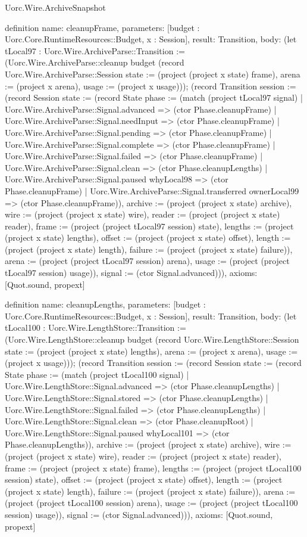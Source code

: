 \begin{lexlean}{Uorc.Wire.ArchiveSnapshot}
\begin{semanticmodule}
definition{
  name: cleanupFrame,
  parameters: [budget : Uorc.Core.RuntimeResources::Budget, x : Session],
  result: Transition,
  body: (let tLocal97 : Uorc.Wire.ArchiveParse::Transition := (Uorc.Wire.ArchiveParse::cleanup budget (record Uorc.Wire.ArchiveParse::Session {state := (project (project x state) frame), arena := (project x arena), usage := (project x usage)})); (record Transition {session := (record Session {state := (record State {phase := (match (project tLocal97 signal)
    | Uorc.Wire.ArchiveParse::Signal.advanced => (ctor Phase.cleanupFrame)
    | Uorc.Wire.ArchiveParse::Signal.needInput => (ctor Phase.cleanupFrame)
    | Uorc.Wire.ArchiveParse::Signal.pending => (ctor Phase.cleanupFrame)
    | Uorc.Wire.ArchiveParse::Signal.complete => (ctor Phase.cleanupFrame)
    | Uorc.Wire.ArchiveParse::Signal.failed => (ctor Phase.cleanupFrame)
    | Uorc.Wire.ArchiveParse::Signal.clean => (ctor Phase.cleanupLengths)
    | Uorc.Wire.ArchiveParse::Signal.paused whyLocal98 => (ctor Phase.cleanupFrame)
    | Uorc.Wire.ArchiveParse::Signal.transferred ownerLocal99 => (ctor Phase.cleanupFrame)), archive := (project (project x state) archive), wire := (project (project x state) wire), reader := (project (project x state) reader), frame := (project (project tLocal97 session) state), lengths := (project (project x state) lengths), offset := (project (project x state) offset), length := (project (project x state) length), failure := (project (project x state) failure)}), arena := (project (project tLocal97 session) arena), usage := (project (project tLocal97 session) usage)}), signal := (ctor Signal.advanced)})),
  axioms: [Quot.sound, propext]
}

definition{
  name: cleanupLengths,
  parameters: [budget : Uorc.Core.RuntimeResources::Budget, x : Session],
  result: Transition,
  body: (let tLocal100 : Uorc.Wire.LengthStore::Transition := (Uorc.Wire.LengthStore::cleanup budget (record Uorc.Wire.LengthStore::Session {state := (project (project x state) lengths), arena := (project x arena), usage := (project x usage)})); (record Transition {session := (record Session {state := (record State {phase := (match (project tLocal100 signal)
    | Uorc.Wire.LengthStore::Signal.advanced => (ctor Phase.cleanupLengths)
    | Uorc.Wire.LengthStore::Signal.stored => (ctor Phase.cleanupLengths)
    | Uorc.Wire.LengthStore::Signal.failed => (ctor Phase.cleanupLengths)
    | Uorc.Wire.LengthStore::Signal.clean => (ctor Phase.cleanupRoot)
    | Uorc.Wire.LengthStore::Signal.paused whyLocal101 => (ctor Phase.cleanupLengths)), archive := (project (project x state) archive), wire := (project (project x state) wire), reader := (project (project x state) reader), frame := (project (project x state) frame), lengths := (project (project tLocal100 session) state), offset := (project (project x state) offset), length := (project (project x state) length), failure := (project (project x state) failure)}), arena := (project (project tLocal100 session) arena), usage := (project (project tLocal100 session) usage)}), signal := (ctor Signal.advanced)})),
  axioms: [Quot.sound, propext]
}


\end{semanticmodule}
\end{lexlean}
